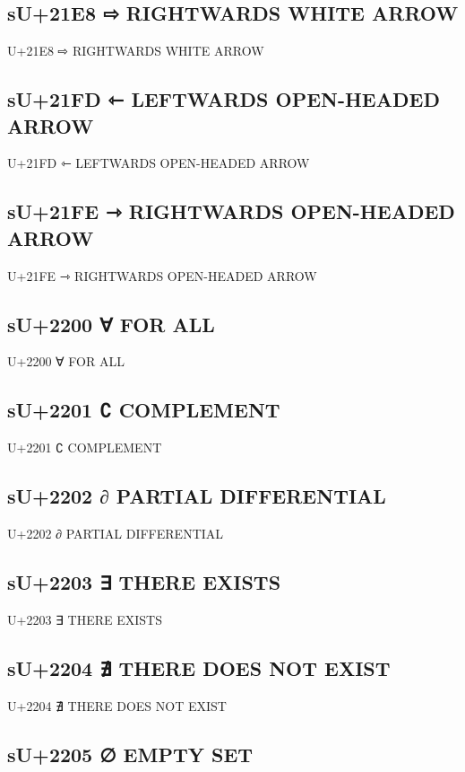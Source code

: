 \subsection{sU+21E8 ⇨ RIGHTWARDS WHITE ARROW}

U+21E8 ⇨ RIGHTWARDS WHITE ARROW

\subsection{sU+21FD ⇽ LEFTWARDS OPEN-HEADED ARROW}

U+21FD ⇽ LEFTWARDS OPEN-HEADED ARROW

\subsection{sU+21FE ⇾ RIGHTWARDS OPEN-HEADED ARROW}

U+21FE ⇾ RIGHTWARDS OPEN-HEADED ARROW

\subsection{sU+2200 ∀ FOR ALL}

U+2200 ∀ FOR ALL

\subsection{sU+2201 ∁ COMPLEMENT}

U+2201 ∁ COMPLEMENT

\subsection{sU+2202 ∂ PARTIAL DIFFERENTIAL}

U+2202 ∂ PARTIAL DIFFERENTIAL

\subsection{sU+2203 ∃ THERE EXISTS}

U+2203 ∃ THERE EXISTS

\subsection{sU+2204 ∄ THERE DOES NOT EXIST}

U+2204 ∄ THERE DOES NOT EXIST

\subsection{sU+2205 ∅ EMPTY SET}

